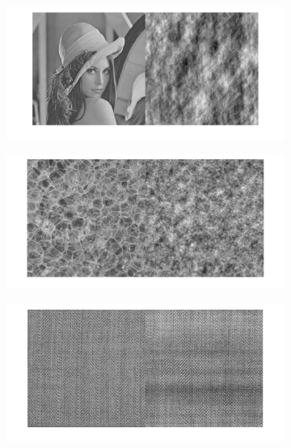 \documentclass[12pt,a4paper,onecolumn]{article}
\begin{document}
\begin{figure}[H]
	\centering
	\begin{subfigure}[b]{\textwidth}
		\centering
		\includegraphics[height = 0.20\textheight]{10_2_lena}
		\label{10_2_lena}
	\end{subfigure}
	\begin{subfigure}[b]{\textwidth}
		\centering
		\includegraphics[height = 0.20\textheight]{10_2_bulles}
		\label{10_2_bulles}
	\end{subfigure}
	\begin{subfigure}[b]{\textwidth}
		\centering
		\includegraphics[height = 0.20\textheight]{10_2_tissu}

\end{subfigure}
\end{figure}
\end{document}
